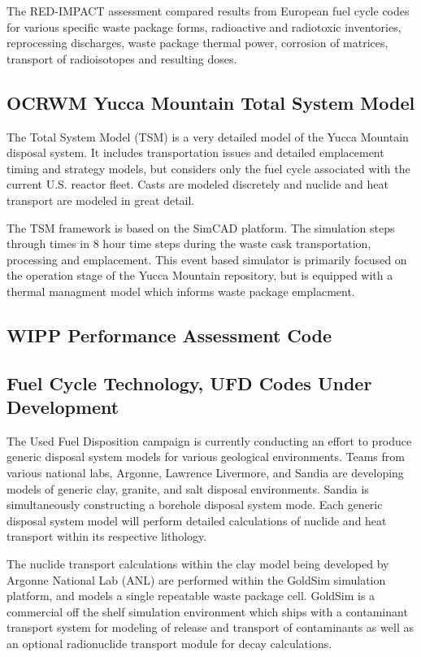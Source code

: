The RED-IMPACT assessment compared results from European fuel cycle 
codes for various specific waste package forms, radioactive and 
radiotoxic inventories, reprocessing discharges,  waste package 
thermal power, corrosion of matrices, transport of radioisotopes and 
resulting doses.


\subsection{OCRWM Yucca Mountain Total System Model}
The Total System Model (TSM) is a very detailed 
model of the Yucca Mountain disposal system. It includes 
transportation issues and detailed emplacement timing and strategy 
models, but considers only the fuel cycle associated with the current  
U.S. reactor fleet. Casts are modeled discretely and nuclide and heat 
transport are modeled in great detail.\cite{turner_discrete_2010} 

The TSM framework is based on the SimCAD platform. The 
simulation steps through times in 8 hour time steps during the waste 
cask transportation, processing and emplacement. This event based 
simulator is primarily focused on the operation stage of the Yucca 
Mountain repository, but is equipped with a thermal managment model 
which informs waste package emplacment.

\subsection{WIPP Performance Assessment Code}

\subsection{Fuel Cycle Technology, UFD Codes Under Development}

The Used Fuel Disposition campaign is currently conducting an effort 
to produce generic disposal system models for various geological 
environments. Teams from various national labs, Argonne, Lawrence 
Livermore, and Sandia are developing models of generic clay, granite,   
and salt disposal environments. Sandia is simultaneously constructing  
a borehole disposal system mode. Each generic disposal system model 
will perform detailed calculations of nuclide  and heat transport 
within its respective lithology. 

The nuclide transport calculations within the  clay model being 
developed by Argonne National Lab (ANL) are performed within the 
GoldSim simulation platform, and models a single repeatable waste 
package cell. GoldSim is a commercial off the shelf simulation 
environment which ships with a contaminant transport system for 
modeling of release and transport of contaminants as well as an 
optional radionuclide transport module for decay calculations.

